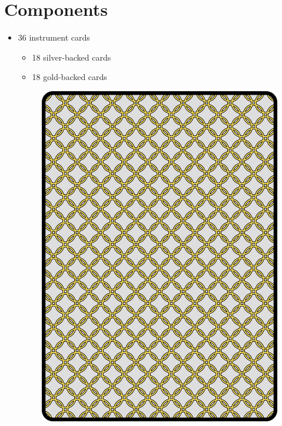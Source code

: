 \documentclass[a6paper, 12pt, parskip=half, DIV=14]{scrartcl}
\begin{document}
\section*{Components}
\begin{itemize}[leftmargin=4ex, nosep]
  \item 36 instrument cards
    \begin{itemize}[nosep, leftmargin=*]
      \item 18 silver-backed cards
      \item 18 gold-backed cards
    \end{itemize}
    \begin{figure}[h]
	\centering    
    \includegraphics[scale=0.04]{Images/CardImages/silver_display_back.png}
    \qquad

\end{figure}
\end{itemize}
\end{document}
